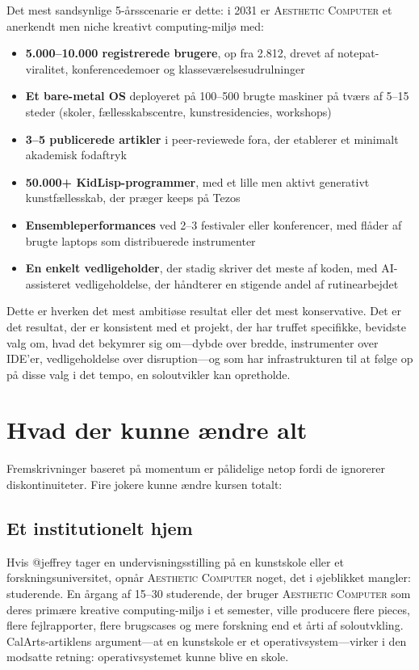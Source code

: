\documentclass[10pt,letterpaper,twocolumn]{article}
\newcommand{\ac}{\textsc{Aesthetic Computer}}
\begin{document}
Det mest sandsynlige 5-årsscenarie er dette: i 2031 er \ac{} et anerkendt men niche kreativt computing-miljø med:

\begin{itemize}
  \item \textbf{5.000--10.000 registrerede brugere}, op fra 2.812, drevet af notepat-viralitet, konferencedemoer og klasseværelsesudrulninger
  \item \textbf{Et bare-metal OS} deployeret på 100--500 brugte maskiner på tværs af 5--15 steder (skoler, fællesskabscentre, kunstresidencies, workshops)
  \item \textbf{3--5 publicerede artikler} i peer-reviewede fora, der etablerer et minimalt akademisk fodaftryk
  \item \textbf{50.000+ KidLisp-programmer}, med et lille men aktivt generativt kunstfællesskab, der præger keeps på Tezos
  \item \textbf{Ensembleperformances} ved 2--3 festivaler eller konferencer, med flåder af brugte laptops som distribuerede instrumenter
  \item \textbf{En enkelt vedligeholder}, der stadig skriver det meste af koden, med AI-assisteret vedligeholdelse, der håndterer en stigende andel af rutinearbejdet
\end{itemize}

Dette er hverken det mest ambitiøse resultat eller det mest konservative. Det er det resultat, der er konsistent med et projekt, der har truffet specifikke, bevidste valg om, hvad det bekymrer sig om---dybde over bredde, instrumenter over IDE'er, vedligeholdelse over disruption---og som har infrastrukturen til at følge op på disse valg i det tempo, en soloutvikler kan opretholde.


\section{Hvad der kunne ændre alt}
\label{sec:wildcards}

Fremskrivninger baseret på momentum er pålidelige netop fordi de ignorerer diskontinuiteter. Fire jokere kunne ændre kursen totalt:

\subsection{Et institutionelt hjem}

Hvis @jeffrey tager en undervisningsstilling på en kunstskole eller et forskningsuniversitet, opnår \ac{} noget, det i øjeblikket mangler: studerende. En årgang af 15--30 studerende, der bruger \ac{} som deres primære kreative computing-miljø i et semester, ville producere flere pieces, flere fejlrapporter, flere brugscases og mere forskning end et årti af soloutvkling. CalArts-artiklens argument---at en kunstskole er et operativsystem---virker i den modsatte retning: operativsystemet kunne blive en skole.
\end{document}
